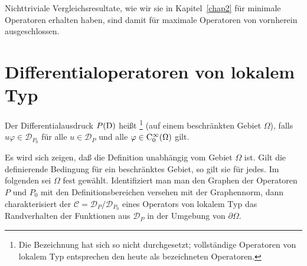Nichttriviale Vergleichsresultate, wie wir sie in Kapitel~\ref{chap2} für minimale Operatoren erhalten haben, sind damit für maximale Operatoren von vornherein ausgeschlossen. 



\section{Differentialoperatoren von lokalem Typ} %
\begin{df}
Der Differentialausdruck $P(\mathrm D)$ heißt \footnote{Die Bezeichnung hat sich so nicht durchgesetzt; vollständige Operatoren von lokalem Typ entsprechen den heute als  bezeichneten Operatoren.} (auf einem beschränkten Gebiet $\Omega$), falls $u\varphi\in\mathcal D_{P_0}$ für alle $u\in\mathcal D_{P}$ und alle $\varphi\in \mathrm C_0^\infty(\Omega)$ gilt.
\end{df}
Es wird sich zeigen, daß die Definition unabhängig vom Gebiet $\Omega$ ist. Gilt die definierende Bedingung für ein beschränktes Gebiet, so gilt sie für jedes. Im folgenden sei $\Omega$ fest gewählt. Identifiziert man man den Graphen der Operatoren $P$ und $P_0$ mit den Definitionsbereichen versehen mit der Graphennorm, dann charakterisiert der  $\mathcal C = \mathcal D_{P}/\mathcal D_{P_0}$ eines Operators von lokalem Typ das Randverhalten der Funktionen aus $\mathcal D_{P}$ in der Umgebung von $\partial\Omega$.

